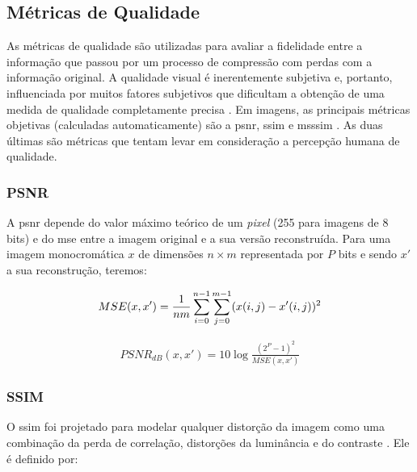 \subsection{Métricas de Qualidade} 

As métricas de qualidade são utilizadas para avaliar a fidelidade entre a informação que passou por um processo de compressão com perdas com a informação original.  A qualidade visual é inerentemente subjetiva e, portanto, influenciada por muitos fatores subjetivos que dificultam a obtenção de uma medida de qualidade completamente precisa \cite{richardson2010h}.  Em imagens, as principais métricas objetivas (calculadas automaticamente) são a \gls{psnr}, \gls{ssim} e \gls{msssim} \cite{richardson2010h}. As duas últimas são métricas que tentam levar em consideração a percepção humana de qualidade. 


\subsubsection{PSNR}

A \acrshort{psnr} depende do valor máximo teórico de um \textit{pixel} (255 para imagens de 8 bits) e do \gls{mse} entre a imagem original e a sua versão reconstruída. Para uma imagem monocromática $x$ de dimensões $n \times m$ representada por $P$ bits e sendo $x'$ a sua reconstrução, teremos:

\begin{equation}
\begin{aligned}
\centering    
MSE(x,x') = \displaystyle\frac{1}{nm}\sum_{i=0}^{n-1} \sum_{j=0}^{m-1} (x(i,j) - x'(i,j))^2
\end{aligned}
\end{equation} 

\begin{equation}
\begin{aligned}
PSNR_{dB}(x,x') = 10 \log\frac{(2^{P} - 1)^{2}}{MSE(x,x')} 
\end{aligned}
\end{equation}


\subsubsection{SSIM}
O \acrshort{ssim} foi projetado para modelar qualquer distorção da imagem como uma combinação da perda de correlação, distorções da luminância e do contraste \cite{hore2010image}. Ele é definido por:

